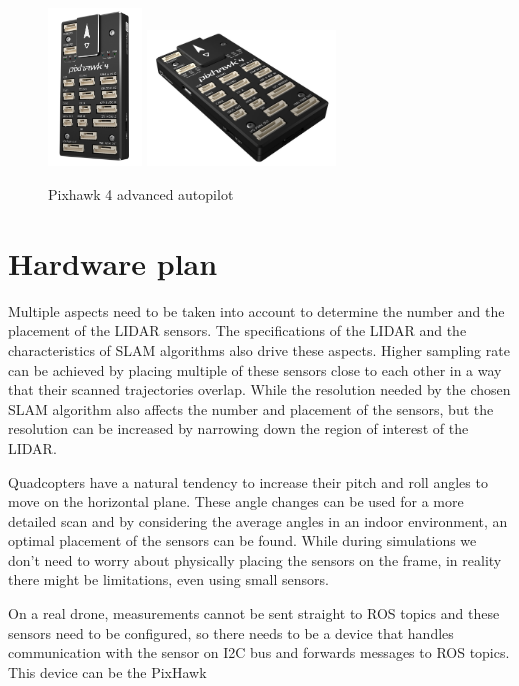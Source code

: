 \begin{figure}[h]
    \centering
    \includegraphics[width=25mm, keepaspectratio]{figures/pixhawk4.jpg}\hspace{0cm}
    \includegraphics[width=50mm, keepaspectratio]{figures/pixhawk4_2.jpg}
    \caption{Pixhawk 4 advanced autopilot}
    \label{fig:px4_sitl_ros_wrapper}
\end{figure}

\section{Hardware plan}
Multiple aspects need to be taken into account to determine the number and the placement of the LIDAR sensors.
The specifications of the LIDAR and the characteristics of SLAM algorithms also drive these aspects. 
Higher sampling rate can be achieved by placing multiple of these sensors close to each other in a way that 
their scanned trajectories overlap. While the resolution needed by the chosen SLAM algorithm also affects 
the number and placement of the sensors, but the resolution can be increased by narrowing down the region of 
interest of the LIDAR.

Quadcopters have a natural tendency to increase their pitch and roll angles to move on the horizontal plane.
These angle changes can be used for a more detailed scan and by considering the average angles in an indoor
environment, an optimal placement of the sensors can be found. While during simulations we don't need to 
worry about physically placing the sensors on the frame, in reality there might be limitations, even using 
small sensors.

On a real drone, measurements cannot be sent straight to ROS topics and these sensors need to be configured, 
so there needs to be a device that handles communication with the sensor on I2C bus and forwards messages 
to ROS topics. This device can be the PixHawk

